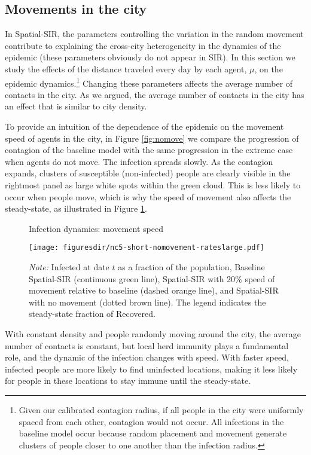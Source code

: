 \documentclass[english,11pt]{article}
\newcommand{\notemix}[4]{\emph{Note:} Infected at date $t$ as a fraction of the population, #1 #2 #3 #4}
\begin{document}
\subsection{Movements in the city}

In Spatial-SIR, the parameters controlling the variation in the random movement contribute to explaining the cross-city heterogeneity in the dynamics of the epidemic (these parameters obviously do not appear in SIR). In this section we study the effects of the distance traveled
every day by each agent, $\mu$, on the epidemic dynamics.\footnote{Given our calibrated contagion radius, if all people in the city were uniformly spaced from each other, contagion would not occur. All infections in the baseline model occur because random placement and movement generate clusters of people closer to one another than the infection radius.} Changing these parameters affects the average number of contacts in the city. As we argued, the average number of contacts in the city has an effect that is similar to city density. 


To provide an intuition of the dependence of the epidemic on the movement speed of agents in the city, in Figure \ref{fig:nomove} we compare the progression of contagion of the baseline model with the same progression in the extreme case when agents do not move.
The infection spreads slowly. As the contagion expands, clusters of 
susceptible (non-infected) people are clearly visible in the rightmost panel as large white spots within the green cloud. This is less likely to occur when people move, which is why 
the speed of movement also affects the steady-state, as illustrated in Figure \ref{fig:nomovement-rates}.

\begin{figure}[t]
    \caption{Infection dynamics: movement speed}\label{fig:nomovement-rates}
    \centering

        	\texttt{[image: figuresdir/nc5-short-nomovement-rateslarge.pdf]} 
%  
    \caption*{\normalfont \footnotesize \notemix{Baseline Spatial-SIR (continuous green line),}{ Spatial-SIR with 20\% speed of movement relative to baseline (dashed orange line),}{ and Spatial-SIR with no movement (dotted brown line).}
    The legend indicates the steady-state fraction of Recovered.}

\end{figure}

With constant density and people randomly moving around the city, the average number of contacts is 
constant, but local herd immunity plays a fundamental role, and the dynamic of the infection changes with speed. With faster speed, infected people
are more likely to find uninfected locations, making it less likely for people in these
locations to stay immune until the steady-state. 
\end{document}
